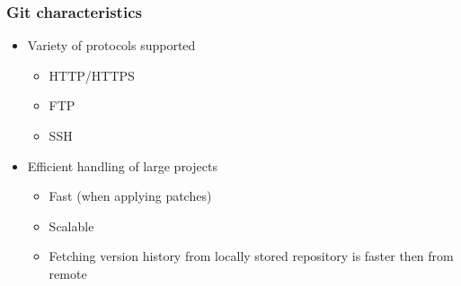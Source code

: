 \begin{frame}
\frametitle{Git characteristics}
\begin{itemize}
	\item Variety of protocols supported
		\begin{itemize}
		\item HTTP/HTTPS
		\item FTP
		\item SSH %
		\end{itemize}
	\item Efficient handling of large projects
		\begin{itemize}
		\item Fast (when applying patches)
		\item Scalable
		\item Fetching version history from locally stored repository is faster then from remote
		\end{itemize}%
\end{itemize}
\end{frame}
